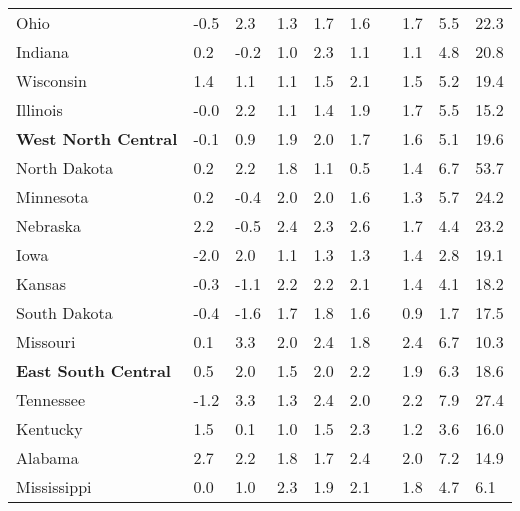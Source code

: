 {\begin{tabular}{p{30mm} R{7mm} R{7mm} R{7mm} R{7mm} 
             R{7mm} p{0mm} R{9mm} R{9mm} R{10mm} }
\hspace{3mm}  Ohio  & -0.5 & 2.3 & 1.3 & 1.7 & 1.6 &  & 1.7 & 5.5 & 22.3 \\
\hspace{3mm}  Indiana  & 0.2 & -0.2 & 1.0 & 2.3 & 1.1 &  & 1.1 & 4.8 & 20.8 \\
\hspace{3mm}  Wisconsin  & 1.4 & 1.1 & 1.1 & 1.5 & 2.1 &  & 1.5 & 5.2 & 19.4 \\
\hspace{3mm}  Illinois  & -0.0 & 2.2 & 1.1 & 1.4 & 1.9 &  & 1.7 & 5.5 & 15.2 \\
\hspace{1mm} \textbf{West North Central}  & -0.1 & 0.9 & 1.9 & 2.0 & 1.7 &  & 1.6 & 5.1 & 19.6 \\
\hspace{3mm}  North Dakota  & 0.2 & 2.2 & 1.8 & 1.1 & 0.5 &  & 1.4 & 6.7 & 53.7 \\
\hspace{3mm}  Minnesota  & 0.2 & -0.4 & 2.0 & 2.0 & 1.6 &  & 1.3 & 5.7 & 24.2 \\
\hspace{3mm}  Nebraska  & 2.2 & -0.5 & 2.4 & 2.3 & 2.6 &  & 1.7 & 4.4 & 23.2 \\
\hspace{3mm}  Iowa  & -2.0 & 2.0 & 1.1 & 1.3 & 1.3 &  & 1.4 & 2.8 & 19.1 \\
\hspace{3mm}  Kansas  & -0.3 & -1.1 & 2.2 & 2.2 & 2.1 &  & 1.4 & 4.1 & 18.2 \\
\hspace{3mm}  South Dakota  & -0.4 & -1.6 & 1.7 & 1.8 & 1.6 &  & 0.9 & 1.7 & 17.5 \\
\hspace{3mm}  Missouri  & 0.1 & 3.3 & 2.0 & 2.4 & 1.8 &  & 2.4 & 6.7 & 10.3 \\
\hspace{1mm} \textbf{East South Central}  & 0.5 & 2.0 & 1.5 & 2.0 & 2.2 &  & 1.9 & 6.3 & 18.6 \\
\hspace{3mm}  Tennessee  & -1.2 & 3.3 & 1.3 & 2.4 & 2.0 &  & 2.2 & 7.9 & 27.4 \\
\hspace{3mm}  Kentucky  & 1.5 & 0.1 & 1.0 & 1.5 & 2.3 &  & 1.2 & 3.6 & 16.0 \\
\hspace{3mm}  Alabama  & 2.7 & 2.2 & 1.8 & 1.7 & 2.4 &  & 2.0 & 7.2 & 14.9 \\
\hspace{3mm}  Mississippi  & 0.0 & 1.0 & 2.3 & 1.9 & 2.1 &  & 1.8 & 4.7 & 6.1 \\

\end{tabular}}
